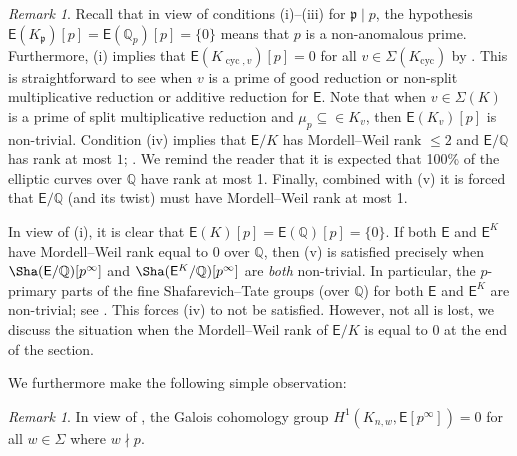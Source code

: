 \documentclass{amsart}
\newcommand{\DK}[1]{\textcolor{purple}{#1}}
\numberwithin{equation}{section}
\theoremstyle{remark}
\newtheorem{remark}[theorem]{Remark}
\newcommand{\cyc}{\operatorname{cyc}}
\newcommand{\Q}{\mathbb{Q}}
\newcommand{\EC}{\mathsf{E}}
\newcommand{\fp}{\mathfrak{p}}
\theoremstyle{plain} %
\begin{document}
\begin{remark}
\label{rem:rank}
Recall that in view of conditions (i)--(iii) for $\fp\mid p$, the hypothesis $\EC(K_\fp)[p] = \EC(\Q_p)[p]=\{0\}$ means that $p$ is a non-anomalous prime.
Furthermore, (i) implies that $\EC(K_{\cyc,v})[p] = 0$ for all $v\in \Sigma(K_{\cyc})$ by \cite[Proposition~5.1]{HM99}.
{This is straightforward to see when $v$ is a prime of good reduction or non-split multiplicative reduction or additive reduction for $\EC$.
Note that when $v\in \Sigma(K)$ is a prime of split multiplicative reduction and $\mu_p\subseteq \in K_v$, then $\EC(K_v)[p]$ is non-trivial.}
Condition (iv) implies that $\EC/K$ has Mordell--Weil rank $\leq 2$ and $\EC/\Q$ has rank at most $1$; \cite[Corollary~7.3]{wuthrich2007fine}.
We remind the reader that it is expected that 100\% of the elliptic curves over $\Q$ have rank at most 1.
Finally, combined with (v) it is forced that $\EC/\Q$ (and its twist) must have Mordell--Weil rank {at most} 1.

{In view of (i), it is clear that $\EC(K)[p] = \EC(\Q)[p] = \{0\}$.
If both $\EC$ and $\EC^K$ have Mordell--Weil rank equal to 0 over $\Q$, then (v) is satisfied precisely when $\Sha(\EC/\Q)[p^\infty]$ and $\Sha(\EC^K/\Q)[p^\infty]$ are \emph{both} non-trivial.
In particular, the $p$-primary parts of the fine Shafarevich--Tate groups (over $\Q$) for both $\EC$ and $\EC^K$ are non-trivial; see \cite[Theorem~3.4]{wuthrich2007fine}.
This forces (iv) to not be satisfied.
However, not all is lost, we discuss the situation when the Mordell--Weil rank of $\EC/K$ is equal to 0 at the end of the section.} 

\end{remark}
We furthermore make the following simple observation:

\begin{remark}
\label{vanishing}
In view of \cite[Proposition~2]{greenberg}, the Galois cohomology group $H^1(K_{n,w},\EC[p^\infty])=0$ for all $w\in \Sigma$ where $w\nmid p$. 
\end{remark}
\end{document}

